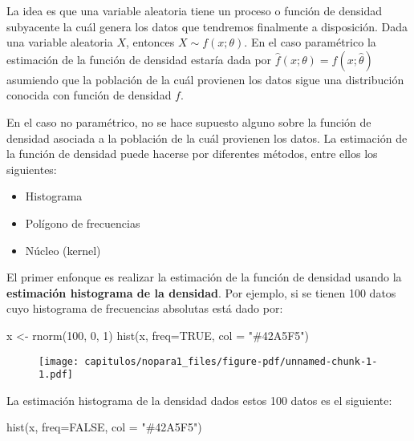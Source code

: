 \documentclass[
  letterpaper,
  DIV=11,
  numbers=noendperiod]{scrreprt}
\newenvironment{Shaded}{\begin{snugshade}}{\end{snugshade}}
\newcommand{\AttributeTok}[1]{\textcolor[rgb]{0.40,0.45,0.13}{#1}}
\newcommand{\ConstantTok}[1]{\textcolor[rgb]{0.56,0.35,0.01}{#1}}
\newcommand{\DecValTok}[1]{\textcolor[rgb]{0.68,0.00,0.00}{#1}}
\newcommand{\FunctionTok}[1]{\textcolor[rgb]{0.28,0.35,0.67}{#1}}
\newcommand{\NormalTok}[1]{\textcolor[rgb]{0.00,0.23,0.31}{#1}}
\newcommand{\OtherTok}[1]{\textcolor[rgb]{0.00,0.23,0.31}{#1}}
\newcommand{\StringTok}[1]{\textcolor[rgb]{0.13,0.47,0.30}{#1}}
\providecommand{\tightlist}{%
  \setlength{\itemsep}{0pt}\setlength{\parskip}{0pt}}\usepackage{longtable,booktabs,array}
\begin{document}
La idea es que una variable aleatoria tiene un proceso o función de
densidad subyacente la cuál genera los datos que tendremos finalmente a
disposición. Dada una variable aleatoria \(X\), entonces
\(X \sim f\left(x;\theta\right)\). En el caso paramétrico la estimación
de la función de densidad estaría dada por
\(\hat f \left(x;\theta\right) = f\left(x;\hat{\theta}\right)\)
asumiendo que la población de la cuál provienen los datos sigue una
distribución conocida con función de densidad \(f\).

En el caso no paramétrico, no se hace supuesto alguno sobre la función
de densidad asociada a la población de la cuál provienen los datos. La
estimación de la función de densidad puede hacerse por diferentes
métodos, entre ellos los siguientes:

\begin{itemize}
\tightlist
\item
  Histograma
\item
  Polígono de frecuencias
\item
  Núcleo (kernel)
\end{itemize}

El primer enfonque es realizar la estimación de la función de densidad
usando la \textbf{estimación histograma de la densidad}. Por ejemplo, si
se tienen 100 datos cuyo histograma de frecuencias absolutas está dado
por:

\begin{Shaded}
\begin{Highlighting}[]
\NormalTok{x }\OtherTok{\textless{}{-}} \FunctionTok{rnorm}\NormalTok{(}\DecValTok{100}\NormalTok{, }\DecValTok{0}\NormalTok{, }\DecValTok{1}\NormalTok{)}
\FunctionTok{hist}\NormalTok{(x, }\AttributeTok{freq=}\ConstantTok{TRUE}\NormalTok{, }\AttributeTok{col =} \StringTok{"\#42A5F5"}\NormalTok{)}
\end{Highlighting}
\end{Shaded}

\begin{figure}[H]

{\centering \texttt{[image: capitulos/nopara1\_files/figure-pdf/unnamed-chunk-1-1.pdf]}

}

\end{figure}

La estimación histograma de la densidad dados estos 100 datos es el
siguiente:

\begin{Shaded}
\begin{Highlighting}[]
\FunctionTok{hist}\NormalTok{(x, }\AttributeTok{freq=}\ConstantTok{FALSE}\NormalTok{, }\AttributeTok{col =} \StringTok{"\#42A5F5"}\NormalTok{)}
\end{Highlighting}
\end{Shaded}
\end{document}

